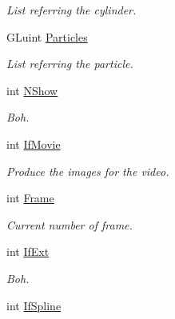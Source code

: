 \begin{DoxyCompactItemize}
\begin{DoxyCompactList}\small\item\em \-List referring the cylinder. \end{DoxyCompactList}\item 
\hypertarget{classForces_a0fd83139e0b18df8d7beb2a83c5ab4d2}{\-G\-Luint \hyperlink{classForces_a0fd83139e0b18df8d7beb2a83c5ab4d2}{\-Particles}}\label{classForces_a0fd83139e0b18df8d7beb2a83c5ab4d2}

\begin{DoxyCompactList}\small\item\em \-List referring the particle. \end{DoxyCompactList}\item 
\hypertarget{classForces_acebb58ed475923de8833745b19b76f69}{int \hyperlink{classForces_acebb58ed475923de8833745b19b76f69}{\-N\-Show}}\label{classForces_acebb58ed475923de8833745b19b76f69}

\begin{DoxyCompactList}\small\item\em \-Boh. \end{DoxyCompactList}\item 
\hypertarget{classForces_a059f36969951363c4c2158e3a0d4f526}{int \hyperlink{classForces_a059f36969951363c4c2158e3a0d4f526}{\-If\-Movie}}\label{classForces_a059f36969951363c4c2158e3a0d4f526}

\begin{DoxyCompactList}\small\item\em \-Produce the images for the video. \end{DoxyCompactList}\item 
\hypertarget{classForces_a2aa5389f98e8d550f84ceab92dc6bd86}{int \hyperlink{classForces_a2aa5389f98e8d550f84ceab92dc6bd86}{\-Frame}}\label{classForces_a2aa5389f98e8d550f84ceab92dc6bd86}

\begin{DoxyCompactList}\small\item\em \-Current number of frame. \end{DoxyCompactList}\item 
\hypertarget{classForces_ae79e4c8bd829af6de9af7f31efd18936}{int \hyperlink{classForces_ae79e4c8bd829af6de9af7f31efd18936}{\-If\-Ext}}\label{classForces_ae79e4c8bd829af6de9af7f31efd18936}

\begin{DoxyCompactList}\small\item\em \-Boh. \end{DoxyCompactList}\item 
\hypertarget{classForces_ae09e8643cb34f698b9d3dc6ffbf6c0e2}{int \hyperlink{classForces_ae09e8643cb34f698b9d3dc6ffbf6c0e2}{\-If\-Spline}}\label{classForces_ae09e8643cb34f698b9d3dc6ffbf6c0e2}


\end{DoxyCompactItemize}
